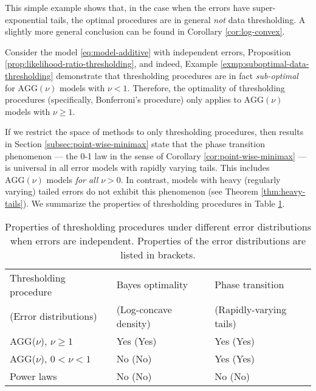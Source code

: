 This simple example shows that, in the case when the errors have super-exponential tails, the optimal procedures are in general \emph{not} data thresholding.
A slightly more general conclusion can be found in Corollary \ref{cor:log-convex}.

\begin{remark} \label{rmk:tail-assumptions}
Consider the model \eqref{eq:model-additive} with independent errors, Proposition \ref{prop:likelihood-ratio-thresholding}, and indeed, Example \ref{exmp:suboptimal-data-thresholding} demonstrate that thresholding procedures are in fact \emph{sub-optimal} for $\text{AGG}(\nu)$ models with $\nu<1$.
Therefore, the optimality of thresholding procedures (specifically, Bonferroni's procedure) only applies to $\text{AGG}(\nu)$ models with $\nu\ge1$. 

If we restrict the space of methods to only thresholding procedures, then results in Section \ref{subsec:point-wise-minimax} state that the phase transition phenomenon --- the 0-1 law in the sense of Corollary \ref{cor:point-wise-minimax} --- is universal in all error models with rapidly varying tails.
This includes $\text{AGG}(\nu)$ models {\it for all} $\nu>0$.
In contrast, models with heavy (regularly varying) tailed errors do not exhibit this phenomenon (see Theorem \ref{thm:heavy-tails}).
We summarize the properties of thresholding procedures in Table \ref{table:role-of-thresholding}. 
\end{remark}

\begin{table}[ht]
    \centering
    \caption{Properties of thresholding procedures under different error distributions when errors are independent. Properties of the error distributions are listed in brackets.}
    \medskip
    \begin{tabular}{p{45mm}p{40mm}p{40mm}} \toprule
        Thresholding procedure & Bayes optimality &  Phase transition \\ 
        (Error distributions) &  (Log-concave density) & (Rapidly-varying tails) \\ \midrule
        AGG($\nu$), $\nu\ge1$ & Yes (Yes) & Yes (Yes) \\ \cmidrule{1-3}
        AGG($\nu$), $0<\nu<1$ & No (No) & Yes (Yes) \\ \cmidrule{1-3}
        Power laws & No (No) & No (No) \\ \bottomrule
    \end{tabular}
    \label{table:role-of-thresholding}
\end{table}


